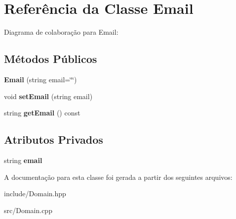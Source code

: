 \hypertarget{classEmail}{}\section{Referência da Classe Email}
\label{classEmail}


Diagrama de colaboração para Email\+:
\subsection*{Métodos Públicos}
\begin{DoxyCompactItemize}
\item 
{\bfseries Email} (string email=\char`\"{}\char`\"{})\hypertarget{classEmail_aee5a4cf06a9acd9246e042f526191ebc}{}\label{classEmail_aee5a4cf06a9acd9246e042f526191ebc}

\item 
void {\bfseries set\+Email} (string email)\hypertarget{classEmail_a2614b3a19d961411d1bece9c1bdf616f}{}\label{classEmail_a2614b3a19d961411d1bece9c1bdf616f}

\item 
string {\bfseries get\+Email} () const \hypertarget{classEmail_aa2898fe9d48e9bf02b32b63fb18b63b9}{}\label{classEmail_aa2898fe9d48e9bf02b32b63fb18b63b9}

\end{DoxyCompactItemize}
\subsection*{Atributos Privados}
\begin{DoxyCompactItemize}
\item 
string {\bfseries email}\hypertarget{classEmail_ac0a91a44652858a0c5178ef836ec9c93}{}\label{classEmail_ac0a91a44652858a0c5178ef836ec9c93}

\end{DoxyCompactItemize}


A documentação para esta classe foi gerada a partir dos seguintes arquivos\+:\begin{DoxyCompactItemize}
\item 
include/Domain.\+hpp\item 
src/Domain.\+cpp\end{DoxyCompactItemize}
